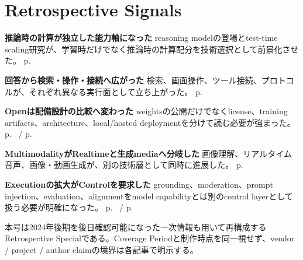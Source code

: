 \section*{Retrospective Signals}
\smallskip
\noindent \textbf{推論時の計算が独立した能力軸になった} reasoning modelの登場とtest-time scaling研究が、学習時だけでなく推論時の計算配分を技術選択として前景化させた。 \hfill{\footnotesize p.~\pageref{pkg:reasoning}}
\par
\smallskip
\noindent \textbf{回答から検索・操作・接続へ広がった} 検索、画面操作、ツール接続、プロトコルが、それぞれ異なる実行面として立ち上がった。 \hfill{\footnotesize p.~\pageref{pkg:action-connectivity}}
\par
\smallskip
\noindent \textbf{Openは配備設計の比較へ変わった} weightsの公開だけでなくlicense、training artifacts、architecture、local/hosted deploymentを分けて読む必要が強まった。 \hfill{\footnotesize p.~\pageref{pkg:open-deployment} / p.~\pageref{pkg:efficiency-serving}}
\par
\smallskip
\noindent \textbf{MultimodalityがRealtimeと生成mediaへ分岐した} 画像理解、リアルタイム音声、画像・動画生成が、別の技術層として同時に進展した。 \hfill{\footnotesize p.~\pageref{pkg:multimodal-media}}
\par
\smallskip
\noindent \textbf{Executionの拡大がControlを要求した} grounding、moderation、prompt injection、evaluation、alignmentをmodel capabilityとは別のcontrol layerとして扱う必要が明確になった。 \hfill{\footnotesize p.~\pageref{pkg:control-evaluation} / p.~\pageref{pkg:synthesis}}
\par
\medskip
\begin{claimboundary}
本号は2024年後期を後日確認可能になった一次情報も用いて再構成するRetrospective Specialである。Coverage Periodと制作時点を同一視せず、vendor / project / author claimの境界は各記事で明示する。
\end{claimboundary}
\medskip
\tableofcontents
